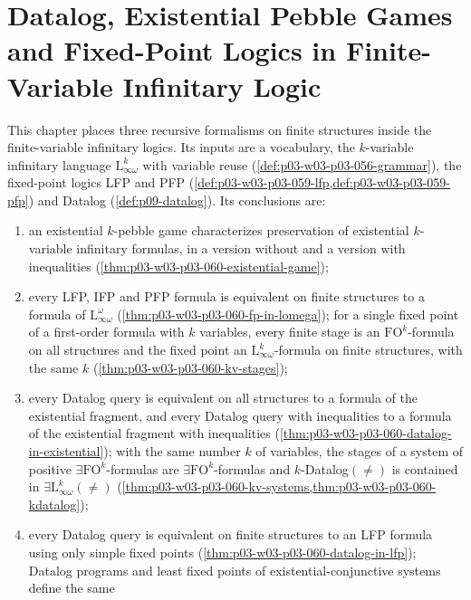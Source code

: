 \chapter{Datalog, Existential Pebble Games and Fixed-Point Logics in Finite-Variable Infinitary Logic}
\label{sec:p03-w03-p03-060-datalog-infinitary}

This chapter places three recursive formalisms on finite structures inside
the finite-variable infinitary logics. Its inputs are a vocabulary, the
\(k\)-variable infinitary language \(\mathrm{L}^k_{\infty\omega}\) with
variable reuse (\cref{def:p03-w03-p03-056-grammar}), the fixed-point logics
LFP and PFP (\cref{def:p03-w03-p03-059-lfp,def:p03-w03-p03-059-pfp}) and
Datalog (\cref{def:p09-datalog}). Its conclusions are:
\begin{enumerate}
\item an existential \(k\)-pebble game characterizes preservation of
      existential \(k\)-variable infinitary formulas, in a version without
      and a version with inequalities
      (\cref{thm:p03-w03-p03-060-existential-game});
\item every LFP, IFP and PFP formula is equivalent on finite structures to a
      formula of \(\mathrm{L}^\omega_{\infty\omega}\)
      (\cref{thm:p03-w03-p03-060-fp-in-lomega}); for a single fixed point
      of a first-order formula with \(k\) variables, every finite stage is
      an \(\mathrm{FO}^k\)-formula on all structures and the fixed point an
      \(\mathrm{L}^k_{\infty\omega}\)-formula on finite structures, with the
      same \(k\) (\cref{thm:p03-w03-p03-060-kv-stages});
\item every Datalog query is equivalent on all structures to a formula of
      the existential fragment, and every Datalog query with inequalities to
      a formula of the existential fragment with inequalities
      (\cref{thm:p03-w03-p03-060-datalog-in-existential}); with the same
      number \(k\) of variables, the stages of a system of positive
      \(\exists\mathrm{FO}^k\)-formulas are \(\exists\mathrm{FO}^k\)-formulas
      and \(k\)-Datalog\((\neq)\) is contained in
      \(\exists\mathrm{L}^k_{\infty\omega}(\neq)\)
      (\cref{thm:p03-w03-p03-060-kv-systems,thm:p03-w03-p03-060-kdatalog});
\item every Datalog query is equivalent on finite structures to an LFP
      formula using only simple fixed points
      (\cref{thm:p03-w03-p03-060-datalog-in-lfp}); Datalog programs and
      least fixed points of existential-conjunctive systems define the same

\end{enumerate}
